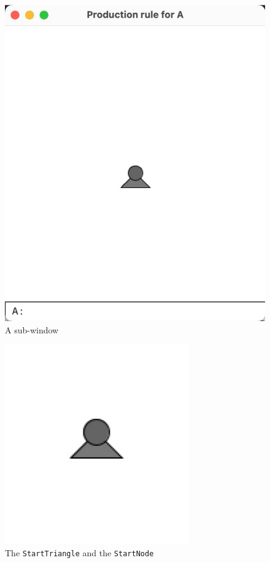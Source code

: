 \documentclass[12pt,twoside]{reedthesis}
\newcommand{\code}[1]{\texttt{#1}}
\begin{document}
		
	\begin{figure}[h!]
	\centering
	\includegraphics[scale=0.5]{Images/HowItWorks2}
	\caption{A sub-window}
	\label {Sub-Window}
	\end{figure}
	
	\begin{figure}[h]
	\centering
	\includegraphics[scale=1]{Images/HowItWorks3}
	\caption{The \code{StartTriangle} and the \code{StartNode}}
	\label {HowItWorks3}
	\end{figure}
	
\end{document}
